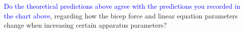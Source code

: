 \documentclass[11pt,letterpaper]{article}
\newcommand{\TODO}[2][inline,color=green!40]{{ \todo[#1]{#2} }}
\newcommand{\TODOg}[2][inline]{ \todo[color=green!40,#1]{#2} }
\newcommand{\question}[2][blue]{\textcolor{#1}{#2}}
\newcommand{\answer}[2][red]{\textcolor{#1}{#2}}
\newcommand{\yint}[1][]{vertical intercept }
\begin{document}
\question{Do the theoretical predictions above agree 
with the predictions you recorded in the chart above},
regarding how the bicep force and linear equation parameters change when
increasing certain apparatus parameters?

\begin{comment}
You probably noticed some similarities between the previous steps.
Why do they seem so similar?  
Is there a relationship between the model parameters
and the slope and \yint  of your graph?
\answer{Since this is a linear model, the model parameters are precisely
	the slope and the \yint  of the graph.}
\end{comment}




\begin{comment}
\section*{Outline}
{{{

Outline of steps up to this point so far
\itemb
	\item Warm up problems, introducing torque to the students for the first
		time
	\item (?) Warm up problems directly involving this apparatus
		\subitem Matching parts of apparatus to parts of body
		\subitem Short exercise with torque?  Maybe intuitive `if we increase
		$r$, what happens to bicep force?'
		\TODOg[]{TODO}
	\item Measure bicep force as a function of weight in
		hand.  Extrapolate equation from graph.
	\item Use the model for $B$ vs $H$ to make a prediction for a new value,
		and test the prediction.
	\item Try to understand coefficients in formula as functions of 
		physical parameters (e.g., lengths and weights) of the apparatus.
	\item TODO
\iteme

Remaining steps
\itemb
	\item Reason physically how coefficients should change if each parameter is
		increased or decreased.
	\item Give them the full formala for $B(H;W,R,r,\alpha)$
	\item Perform some checks (both experimental and mathematical)
		to verify that this formula makes sense
	\subitem Understand that it is linear in certain variables
\iteme

\TODO{Note:  It's difficult to tell how much time this will take students, but
it's likely this is far too much content already.}
}}}
\end{comment}
\end{document}

